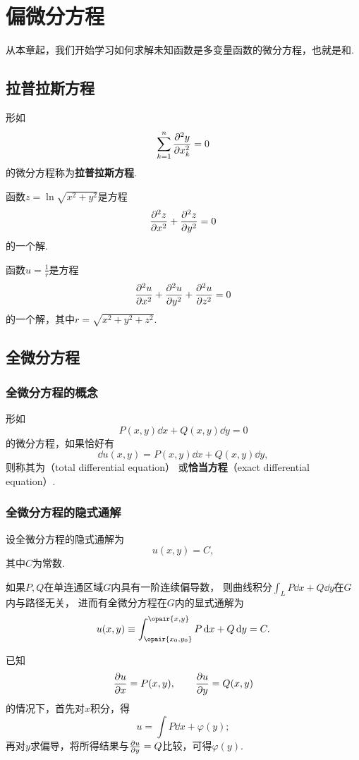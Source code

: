 \chapter{偏微分方程}
从本章起，我们开始学习如何求解未知函数是多变量函数的微分方程，也就是和.

\section{拉普拉斯方程}
\begin{definition}
形如\[
\sum\limits_{k=1}^{n} \pdv[2]{y}{x_k} = 0
\]的微分方程称为\textbf{拉普拉斯方程}.
\end{definition}

\begin{example}
函数\(z=\ln\sqrt{x^2+y^2}\)是方程\[
\pdv[2]{z}{x} + \pdv[2]{z}{y} = 0
\]的一个解.
\end{example}

\begin{example}
函数\(u=\frac{1}{r}\)是方程\[
\pdv[2]{u}{x} + \pdv[2]{u}{y} + \pdv[2]{u}{z} = 0
\]的一个解，其中\(r=\sqrt{x^2+y^2+z^2}\).
\end{example}

\section{全微分方程}
\subsection{全微分方程的概念}
\begin{definition}
形如\[
P(x,y)\dd{x} + Q(x,y)\dd{y} = 0
\]的微分方程，如果恰好有\[
\dd{u(x,y)} = P(x,y)\dd{x} + Q(x,y)\dd{y},
\]则称其为（total differential equation）%
或\textbf{恰当方程}（exact differential equation）.
\end{definition}

\subsection{全微分方程的隐式通解}
设全微分方程的隐式通解为\[
u(x,y) = C,
\]其中\(C\)为常数.

如果\(P,Q\)在单连通区域\(G\)内具有一阶连续偏导数，%
则曲线积分\(\int_L P\dd{x}+Q\dd{y}\)在\(G\)内与路径无关，%
进而有全微分方程在\(G\)内的显式通解为\[
u(x,y) \equiv \int_{\opair{x_0,y_0}}^{\opair{x,y}} P\dd{x}+Q\dd{y} = C.
\]

已知\[
\pdv{u}{x} = P(x,y),
\qquad
\pdv{u}{y} = Q(x,y)
\]的情况下，首先对\(x\)积分，得\[
u = \int P \dd{x} + \varphi(y);
\]再对\(y\)求偏导，将所得结果与\(\pdv{u}{y} = Q\)比较，可得\(\varphi(y)\).

